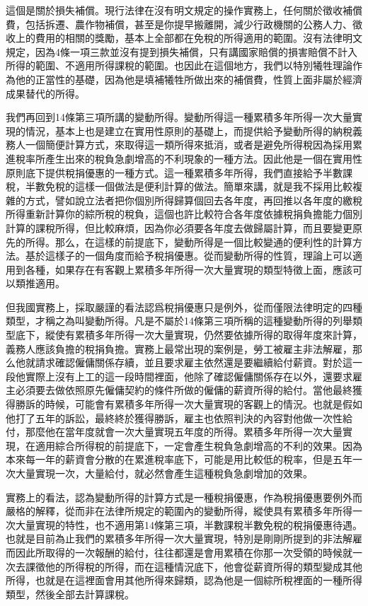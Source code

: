\documentclass[oneside,sub3section]{ctexbook}
\begin{document}
這個是關於損失補償。現行法律在沒有明文規定的操作實務上，任何關於徵收補償費，包括拆遷、農作物補償，甚至是你提早搬離開，減少行政機關的公務人力、徵收上的費用的相關的獎勵，基本上全部都在免稅的所得適用的範圍。沒有法律明文規定，因為4條一項三款並沒有提到損失補償，只有講國家賠償的損害賠償不計入所得的範圍、不適用所得課稅的範圍。也因此在這個地方，我們以特別犧牲理論作為他的正當性的基礎，因為他是填補犧牲所做出來的補償費，性質上面非屬於經濟成果替代的所得。

我們再回到14條第三項所講的變動所得。變動所得這一種累積多年所得一次大量實現的情況，基本上也是建立在實用性原則的基礎上，而提供給予變動所得的納稅義務人一個簡便計算方式，來取得這一類所得來抵消，或者是避免所得稅因為採用累進稅率所產生出來的稅負急劇增高的不利現象的一種方法。因此他是一個在實用性原則底下提供稅捐優惠的一種方式。這一種累積多年所得，我們直接給予半數課稅，半數免稅的這樣一個做法是便利計算的做法。簡單來講，就是我不採用比較複雜的方式，譬如說立法者把你個別所得歸算個回去各年度，再回推以各年度的繳稅所得重新計算你的綜所稅的稅負，這個也許比較符合各年度依據稅捐負擔能力個別計算的課稅所得，但比較麻煩，因為你必須要各年度去做歸屬計算，而且要變更原先的所得。那么，在這樣的前提底下，變動所得是一個比較變通的便利性的計算方法。基於這樣子的一個角度而給予稅捐優惠。從而變動所得的性質，理論上可以適用到各種，如果存在有客觀上累積多年所得一次大量實現的類型特徵上面，應該可以類推適用。

但我國實務上，採取嚴謹的看法認爲稅捐優惠只是例外，從而僅限法律明定的四種類型，才稱之為叫變動所得。凡是不屬於14條第三項所稱的這種變動所得的列舉類型底下，縱使有累積多年所得一次大量實現，仍然要依據所得的取得年度來計算，義務人應該負擔的稅捐負擔。實務上最常出現的案例是，勞工被雇主非法解雇，那么他就請求確認僱傭關係存續，並且要求雇主依然還是要繼續給付薪資。對於這一段他實際上沒有上工的這一段時間裡面，他除了確認僱傭關係存在以外，還要求雇主必須要去做依照原先僱傭契約的條件所做的僱傭的薪資所得的給付。當他最終獲得勝訴的時候，可能會有累積多年所得一次大量實現的客觀上的情況。也就是假如他打了五年的訴訟，最終終於獲得勝訴，雇主也依照判決的內容對他做一次性給付，那麼他在當年度就會一次大量實現五年度的所得。累積多年所得一次大量實現，在適用綜合所得稅的前提底下，一定會產生稅負急劇增高的不利的效果。因為本來每一年的薪資會分散的在累進稅率底下，可能是用比較低的稅率，但是五年一次大量實現一次，大量給付，就必然會產生這種稅負急劇增加的效果。

實務上的看法，認為變動所得的計算方式是一種稅捐優惠，作為稅捐優惠要例外而嚴格的解釋，從而非在法律所規定的範圍內的變動所得，縱使具有累積多年所得一次大量實現的特性，也不適用第14條第三項，半數課稅半數免稅的稅捐優惠待遇。也就是目前為止我們的累積多年所得一次大量實現，特別是剛剛所提到的非法解雇而因此所取得的一次報酬的給付，往往都還是會用累積在你那一次受領的時候就一次去課徵他的所得稅的所得，而在這種情況底下，他會從薪資所得的類型變成其他所得，也就是在這裡面會用其他所得來歸類，認為他是一個綜所稅裡面的一種所得類型，然後全部去計算課稅。
\end{document}
